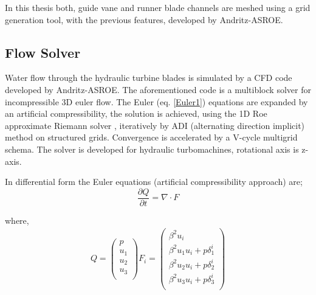 In this thesis both, guide vane and runner blade channels are meshed using a grid generation tool, with the previous features, developed by Andritz-ASROE. 

\FloatBarrier
\subsection{Flow Solver}
\label{FlowSolvert}
Water flow through the hydraulic turbine blades is simulated by a CFD code developed by Andritz-ASROE. The aforementioned code is a multiblock solver for incompressible 3D euler flow. The Euler (eq. \ref{Euler1}) equations are expanded by an artificial compressibility, the solution is achieved, using the 1D Roe approximate Riemann solver \cite{Roe81}, iteratively by ADI (alternating direction implicit) method on structured grids. Convergence is accelerated by a V-cycle multigrid schema. The solver is developed for hydraulic turbomachines, rotational axis is z-axis.


In differential form the Euler equations (artificial compressibility approach) are;
\begin{equation} 
    \frac{\partial Q}{\partial t}=\nabla \cdot F
	\label{Euler1}
\end{equation}

where,
\begin{eqnarray}
		Q= \left( {\begin{array}{c}
 		p    \\
 		u_1  \\
 		u_2  \\
 		u_3  \\
 		\end{array} } \right)
 		F_i= \left( {\begin{array}{c}
 		\beta ^2 u_i    \\
 		\beta ^2 u_1u_i + p\delta _1^i  \\
		\beta ^2 u_2u_i + p\delta _2^i  \\
 		\beta ^2 u_3u_i + p\delta _3^i  \\
 		\end{array} } \right)
\label{Euler3}
\end{eqnarray} 
 

